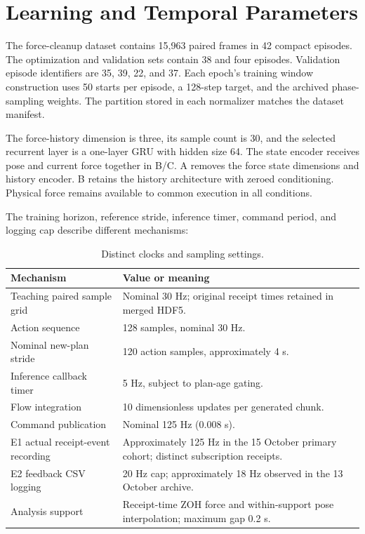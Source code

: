 \section{Learning and Temporal Parameters}
The force-cleanup dataset contains 15,963 paired frames in 42 compact episodes. The optimization and validation sets contain 38 and four episodes. Validation episode identifiers are 35, 39, 22, and 37. Each epoch's training window construction uses 50 starts per episode, a 128-step target, and the archived phase-sampling weights. The partition stored in each normalizer matches the dataset manifest.

The force-history dimension is three, its sample count is 30, and the selected recurrent layer is a one-layer GRU with hidden size 64. The state encoder receives pose and current force together in B/C. A removes the force state dimensions and history encoder. B retains the history architecture with zeroed conditioning. Physical force remains available to common execution in all conditions.

The training horizon, reference stride, inference timer, command period, and logging cap describe different mechanisms:
\begin{table}[tbp]\centering\small
\caption[Distinct clocks and sampling settings]{Distinct clocks and sampling settings.}
\label{tab:clock_definitions}
\begin{tabularx}{\textwidth}{P{0.39\textwidth}X}
\toprule Mechanism & Value or meaning \\ \midrule
Teaching paired sample grid & Nominal 30 Hz; original receipt times retained in merged HDF5. \\
Action sequence & 128 samples, nominal 30 Hz. \\
Nominal new-plan stride & 120 action samples, approximately 4 s. \\
Inference callback timer & 5 Hz, subject to plan-age gating. \\
Flow integration & 10 dimensionless updates per generated chunk. \\
Command publication & Nominal 125 Hz (0.008 s). \\
E1 actual receipt-event recording & Approximately 125 Hz in the 15 October primary cohort; distinct subscription receipts. \\
E2 feedback CSV logging & 20 Hz cap; approximately 18 Hz observed in the 13 October archive. \\
Analysis support & Receipt-time ZOH force and within-support pose interpolation; maximum gap 0.2 s. \\
\bottomrule
\end{tabularx}
\end{table}

